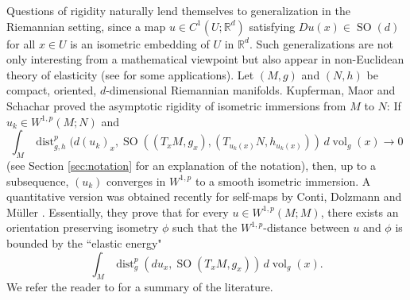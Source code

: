 \documentclass{article}
\numberwithin{equation}{section}
\theoremstyle{definition}
\theoremstyle{remark}
\DeclareMathOperator{\dist}{dist}
\DeclareMathOperator{\SO}{SO}
\DeclareMathOperator{\vol}{vol}
\begin{document}
Questions of rigidity naturally lend themselves to generalization in the Riemannian setting, since a map $u \in C^1(U; \mathbb{R}^d)$ satisfying $Du(x) \in \SO(d)$ for all $x \in U$ is an isometric embedding of $U$ in $\mathbb{R}^d$. Such generalizations are not only interesting from a mathematical viewpoint but also appear in non-Euclidean theory of elasticity (see \cite[Section 1.3]{KMS} for some applications). Let $(M, g)$ and $(N, h)$ be compact, oriented, $d$-dimensional Riemannian manifolds. Kupferman, Maor and Schachar \cite{KMS} proved the asymptotic rigidity of isometric immersions from $M$ to $N$: If $u_k \in W^{1, p}(M; N)$ and
\[
\int_M \dist_{g, h}^p(d(u_k)_x, \SO((T_xM, g_x), (T_{u_k(x)}N, h_{u_k(x)})) \, d\vol_g(x) \to 0
\]
(see Section \ref{sec:notation} for an explanation of the notation), then, up to a subsequence, $(u_k)$ converges in $W^{1, p}$ to a smooth isometric immersion. A quantitative version was obtained recently for self-maps by Conti, Dolzmann and Müller \cite{CDM}. Essentially, they prove that for every $u \in W^{1, p}(M; M)$, there exists an orientation preserving isometry $\phi$ such that the $W^{1, p}$-distance between $u$ and $\phi$ is bounded by the ``elastic energy"
\[
\int_M \dist_g^p(du_x, \SO(T_xM, g_x)) \, d\vol_g(x).
\]
We refer the reader to \cite[Figure 1]{AKM2} for a summary of the literature. 
\end{document}
